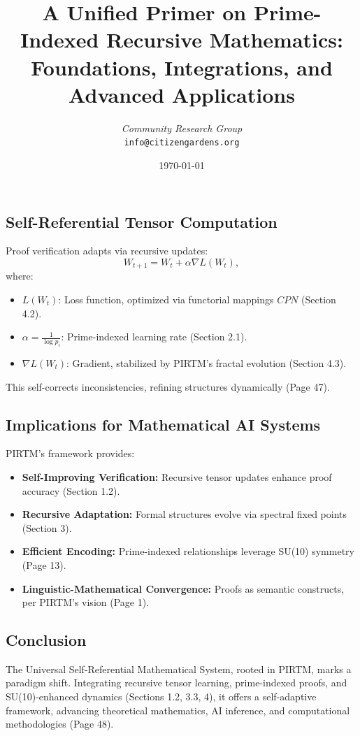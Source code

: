 \documentclass{article}
\theoremstyle{plain}
\begin{document}
\subsection{Self-Referential Tensor Computation}
Proof verification adapts via recursive updates:
\begin{equation}
W_{t+1} = W_t + \alpha \nabla L(W_t),
\end{equation}
where:
\begin{itemize}
    \item \( L(W_t) \): Loss function, optimized via functorial mappings \( CPN \) (Section 4.2).
    \item \( \alpha = \frac{1}{\log p_i} \): Prime-indexed learning rate (Section 2.1).
    \item \( \nabla L(W_t) \): Gradient, stabilized by PIRTM’s fractal evolution (Section 4.3).
\end{itemize}
This self-corrects inconsistencies, refining structures dynamically (Page 47).

\subsection{Implications for Mathematical AI Systems}
PIRTM’s framework provides:
\begin{itemize}
    \item \textbf{Self-Improving Verification:} Recursive tensor updates enhance proof accuracy (Section 1.2).
    \item \textbf{Recursive Adaptation:} Formal structures evolve via spectral fixed points (Section 3).
    \item \textbf{Efficient Encoding:} Prime-indexed relationships leverage SU(10) symmetry (Page 13).
    \item \textbf{Linguistic-Mathematical Convergence:} Proofs as semantic constructs, per PIRTM’s vision (Page 1).
\end{itemize}

\subsection{Conclusion}
The Universal Self-Referential Mathematical System, rooted in PIRTM, marks a paradigm shift. Integrating recursive tensor learning, prime-indexed proofs, and SU(10)-enhanced dynamics (Sections 1.2, 3.3, 4), it offers a self-adaptive framework, advancing theoretical mathematics, AI inference, and computational methodologies (Page 48).

\title{\textbf{A Unified Primer on Prime-Indexed Recursive Mathematics: \\
Foundations, Integrations, and Advanced Applications}}
\author{\textit{Community Research Group}\\
\texttt{info@citizengardens.org}}
\date{\today}
\end{document}

